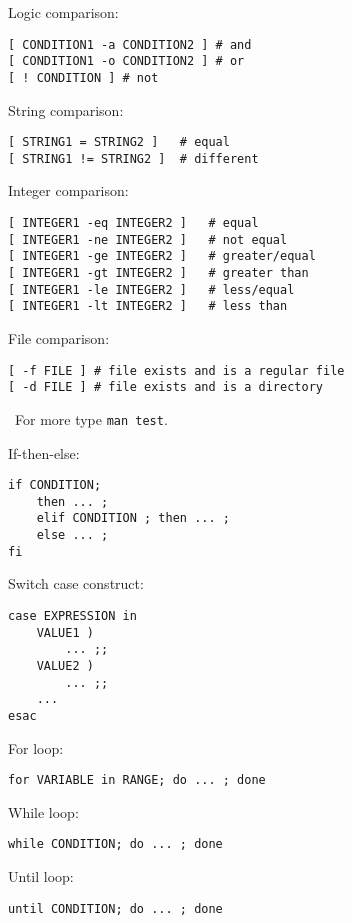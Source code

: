 \documentclass[twocolumn,8pt]{article}
\begin{document}
\begin{mdframed}[frametitle=Test command for conditions]

Logic comparison:
\begin{lstlisting}
[ CONDITION1 -a CONDITION2 ] # and
[ CONDITION1 -o CONDITION2 ] # or
[ ! CONDITION ] # not
\end{lstlisting}

String comparison:
\begin{lstlisting}
[ STRING1 = STRING2 ]   # equal
[ STRING1 != STRING2 ]  # different
\end{lstlisting}

Integer comparison:
\begin{lstlisting}
[ INTEGER1 -eq INTEGER2 ]   # equal
[ INTEGER1 -ne INTEGER2 ]   # not equal
[ INTEGER1 -ge INTEGER2 ]   # greater/equal
[ INTEGER1 -gt INTEGER2 ]   # greater than
[ INTEGER1 -le INTEGER2 ]   # less/equal
[ INTEGER1 -lt INTEGER2 ]   # less than
\end{lstlisting}

File comparison:
\begin{lstlisting}
[ -f FILE ] # file exists and is a regular file
[ -d FILE ] # file exists and is a directory
\end{lstlisting}

\faInfoCircle\ For more type \texttt{man test}.

\vspace{3pt}
\end{mdframed}


\begin{mdframed}[frametitle=Conditions]
If-then-else:
\begin{lstlisting}
if CONDITION; 
    then ... ; 
    elif CONDITION ; then ... ; 
    else ... ; 
fi
\end{lstlisting}

Switch case construct:
\begin{lstlisting}
case EXPRESSION in
    VALUE1 )
        ... ;;
    VALUE2 )
        ... ;;
    ...
esac
\end{lstlisting}

\end{mdframed}


\begin{mdframed}[frametitle=Loops]
For loop:
\begin{lstlisting}
for VARIABLE in RANGE; do ... ; done
\end{lstlisting}

While loop:
\begin{lstlisting}
while CONDITION; do ... ; done
\end{lstlisting}
Until loop:
\begin{lstlisting}
until CONDITION; do ... ; done
\end{lstlisting}

\end{mdframed}
\end{document}
